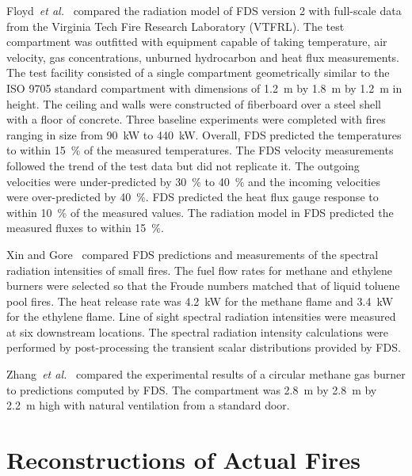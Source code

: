 Floyd~{\em et al.}~\cite{Floyd:1,Floyd:6} compared the radiation model of  FDS version 2  with full-scale  data from  the Virginia  Tech Fire
Research Laboratory (VTFRL).  The  test compartment was outfitted with equipment   capable   of  taking   temperature,   air  velocity,   gas
concentrations, unburned hydrocarbon  and heat flux measurements.  The test facility consisted of  a single compartment geometrically similar to the
ISO 9705 standard compartment with dimensions of 1.2~m by 1.8~m by  1.2~m  in height.   The  ceiling  and  walls were  constructed  of fiberboard
over  a steel  shell  with  a  floor of  concrete.   Three baseline experiments  were completed with  fires ranging in  size from 90~kW  to 440~kW.
Overall,  FDS  predicted  the  temperatures  to within  15~\%  of  the measured  temperatures.  The  FDS velocity  measurements  followed the trend
of  the test  data  but did  not  replicate  it.  The  outgoing velocities  were under-predicted by  30~\% to  40~\% and  the incoming velocities
were  over-predicted by 40~\%. FDS predicted  the heat flux gauge response to within 10~\%  of the measured values.  The radiation model  in FDS
predicted the  measured  fluxes to  within 15~\%.

Xin   and  Gore~\cite{Xin:JSS2003}   compared   FDS  predictions   and measurements  of the  spectral radiation  intensities of  small fires. The
fuel flow rates for  methane and ethylene burners were selected so that the  Froude numbers  matched that of  liquid toluene  pool fires. The heat
release rate was 4.2~kW  for the methane flame and 3.4~kW for the ethylene flame.  Line of sight spectral radiation intensities were measured  at
six  downstream  locations.    The  spectral  radiation intensity calculations were performed by post-processing the transient scalar  distributions
provided  by FDS.

Zhang~{\em et al.}~\cite{Zhang:1} compared the experimental results of a  circular methane  gas burner  to predictions  computed by  FDS. The
compartment was 2.8~m by 2.8~m  by 2.2~m high with natural ventilation from a  standard door.




\section{Reconstructions of Actual Fires}

